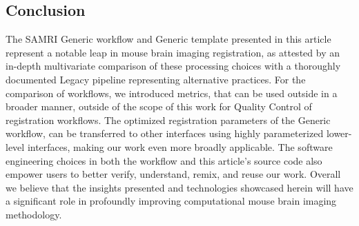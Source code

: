 \subsection{Conclusion}

The SAMRI Generic workflow and Generic template presented in this article represent a notable leap in mouse brain imaging registration, as attested by an in-depth multivariate comparison of these processing choices with a thoroughly documented Legacy pipeline representing alternative practices.
For the comparison of workflows, we introduced metrics, that can be used outside in a broader manner, outside of the scope of this work for Quality Control of registration workflows.
The optimized registration parameters of the Generic workflow, can be transferred to other interfaces using highly parameterized lower-level interfaces, making our work even more broadly applicable.
The software engineering choices in both the workflow and this article's source code also empower users to better verify, understand, remix, and reuse our work.
Overall we believe that the insights presented and technologies showcased herein will have a significant role in profoundly improving computational mouse brain imaging methodology.

